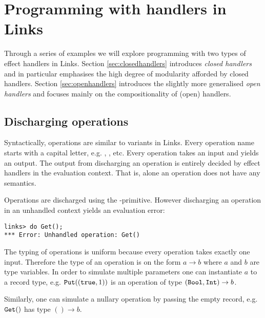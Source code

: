 \chapter{Programming with handlers in Links}\label{ch:programming-with-handlers}
Through a series of examples we will explore programming with two types of effect handlers in Links. Section \ref{sec:closedhandlers} introduces \emph{closed handlers} and in particular emphasises the high degree of modularity afforded by closed handlers. Section \ref{sec:openhandlers} introduces the slightly more generalised \emph{open handlers} and focuses mainly on the compositionality of (open) handlers.

\section{Discharging operations}\label{sec:discharge}
Syntactically, operations are similar to variants in Links. Every operation name starts with a capital letter, e.g. , , etc. Every operation takes an input and yields an output. The output from discharging an operation is entirely decided by effect handlers in the evaluation context. That is, alone an operation does not have any semantics.

Operations are discharged using the -primitive. However discharging an operation in an unhandled context yields an evaluation error:
\begin{lstlisting}[style=links]
links> do Get();
*** Error: Unhandled operation: Get()
\end{lstlisting}
The typing of operations is uniform because every operation takes exactly one input. Therefore the type of an operation is on the form $a \to b$ where $a$ and $b$ are type variables. In order to simulate multiple parameters one can instantiate $a$ to a record type, e.g. $\texttt{Put}((\texttt{true},1))$ is an operation of type $(\texttt{Bool},\texttt{Int}) \to b$.

Similarly, one can simulate a nullary operation by passing the empty record, e.g. $\texttt{Get}()$ has type $() \to b$.
